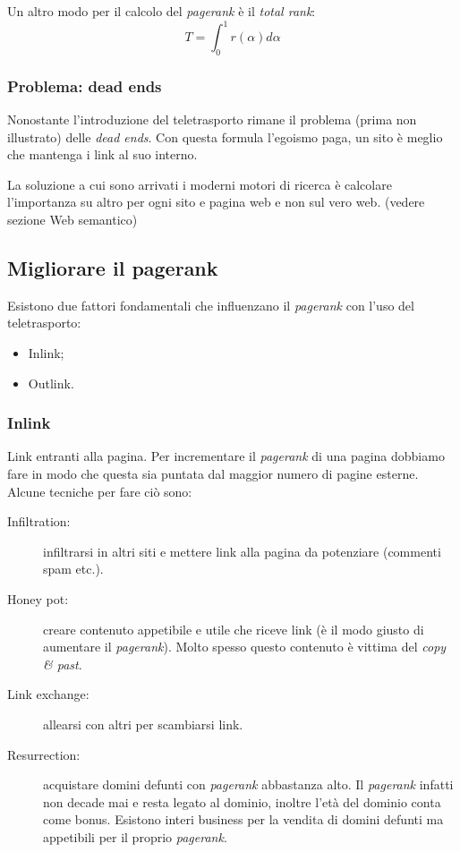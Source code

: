 			Un altro modo per il calcolo del \emph{pagerank} è il \emph{total rank}:
			\[
				T=\int_0^1r(\alpha) d\alpha
			\]
			
		
			\subsubsection{Problema: dead ends}
				Nonostante l'introduzione del teletrasporto rimane il problema (prima non illustrato) delle \emph{dead ends}. Con questa formula l'egoismo paga, un sito è meglio che mantenga i link al suo interno.
				
				La soluzione a cui sono arrivati i moderni motori di ricerca è calcolare l'importanza su altro per ogni sito e pagina web e non sul vero web. (vedere sezione Web semantico)
		
		\subsection{Migliorare il pagerank}
			Esistono due fattori fondamentali che influenzano il \emph{pagerank} con l'uso del teletrasporto:
			\begin{itemize}
				\item Inlink;
				\item Outlink.
			\end{itemize}
		
			\subsubsection{Inlink}
				Link entranti alla pagina. Per incrementare il \emph{pagerank} di una pagina dobbiamo fare in modo che questa sia puntata dal maggior numero di pagine esterne. Alcune tecniche per fare ciò sono:
				\begin{description}
					\item[Infiltration:] infiltrarsi in altri siti e mettere link alla pagina da potenziare (commenti spam etc.).
					\item[Honey pot:] creare contenuto appetibile e utile che riceve link (è il modo giusto di aumentare il \emph{pagerank}). Molto spesso questo contenuto è vittima del \emph{copy \& past}.
					\item[Link exchange:] allearsi con altri per scambiarsi link.
					\item[Resurrection:] acquistare domini defunti con \emph{pagerank} abbastanza alto. Il \emph{pagerank} infatti non decade mai e resta legato al dominio, inoltre l'età del dominio conta come bonus. Esistono interi business per la vendita di domini defunti ma appetibili per il proprio \emph{pagerank}.
				\end{description}
				
